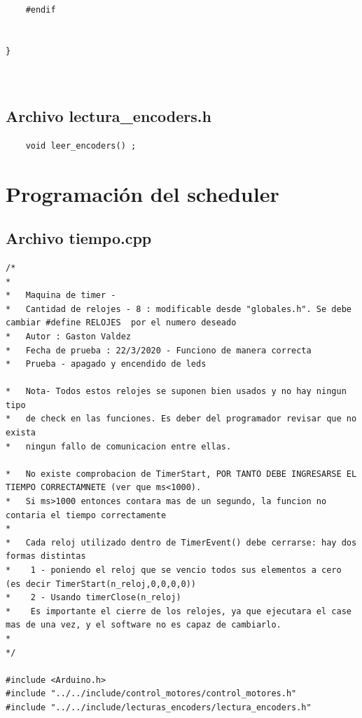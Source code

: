 \begin{appendices}
\begin{verbatim}
	#endif  
	
	
}



		\end{verbatim}

	
	\subsection{Archivo lectura\_encoders.h} 

	\begin{verbatim}
	void leer_encoders() ; 
	\end{verbatim}




	
	\section{Programación del scheduler} 
	\subsection{Archivo tiempo.cpp} 

		\begin{verbatim}
/*
*   
*   Maquina de timer -
*   Cantidad de relojes - 8 : modificable desde "globales.h". Se debe cambiar #define RELOJES  por el numero deseado
*   Autor : Gaston Valdez 
*   Fecha de prueba : 22/3/2020 - Funciono de manera correcta
*   Prueba - apagado y encendido de leds

*   Nota- Todos estos relojes se suponen bien usados y no hay ningun tipo
*   de check en las funciones. Es deber del programador revisar que no exista
*   ningun fallo de comunicacion entre ellas.

*   No existe comprobacion de TimerStart, POR TANTO DEBE INGRESARSE EL TIEMPO CORRECTAMNETE (ver que ms<1000).
*   Si ms>1000 entonces contara mas de un segundo, la funcion no contaria el tiempo correctamente
*
*   Cada reloj utilizado dentro de TimerEvent() debe cerrarse: hay dos formas distintas
*    1 - poniendo el reloj que se vencio todos sus elementos a cero (es decir TimerStart(n_reloj,0,0,0,0))
*    2 - Usando timerClose(n_reloj)
*    Es importante el cierre de los relojes, ya que ejecutara el case mas de una vez, y el software no es capaz de cambiarlo.
*    
*/

#include <Arduino.h>
#include "../../include/control_motores/control_motores.h"
#include "../../include/lecturas_encoders/lectura_encoders.h"



\end{verbatim}
\end{appendices}
